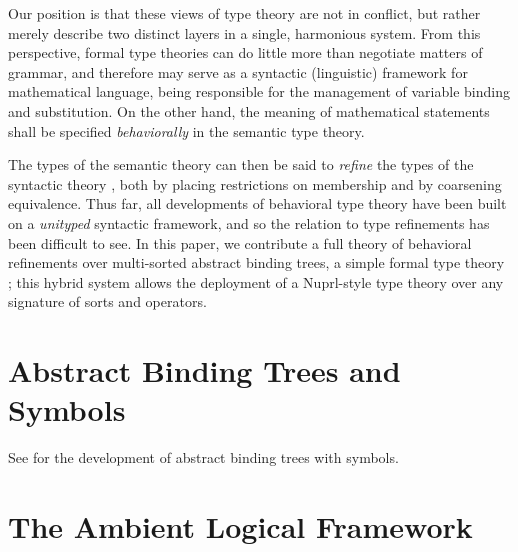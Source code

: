 \documentclass[11pt]{article}
\newif\ifcolored
\theoremstyle{definition}
\theoremstyle{remark}
\numberwithin{equation}{section}
\def\IModeColorName{MidnightBlue}
\def\OModeColorName{Maroon}
\def\IModeColorName{Black}
\def\OModeColorName{Black}
\newcommand\IMode[1]{{\color{\IModeColorName}{#1}}}
\newcommand\OMode[1]{{\color{\OModeColorName}{#1}}}
\begin{document}
Our position is that these views of type theory are not in conflict, but rather
merely describe two distinct layers in a single, harmonious system. From this
perspective, formal type theories can do little more than negotiate matters of
grammar, and therefore may serve as a syntactic (linguistic) framework
for mathematical language, being responsible for the management of variable
binding and substitution. On the other hand, the meaning of mathematical
statements shall be specified \emph{behaviorally} in the semantic type
theory.

The types of the semantic theory can then be said to \emph{refine} the types of
the syntactic theory \cite{harper-davies:2014, harper-duff:2015, harper:2016},
both by placing restrictions on membership and by coarsening equivalence. Thus
far, all developments of behavioral type theory have been built on a
\emph{unityped} syntactic framework, and so the relation to type refinements
has been difficult to see. In this paper, we contribute a full theory of
behavioral refinements over multi-sorted abstract binding trees, a simple
formal type theory \cite{harper:2016, sterling-morrison:2015}; this hybrid
system allows the deployment of a Nuprl-style type theory over any signature of
sorts and operators.

\section{Abstract Binding Trees and Symbols}

See \cite{sterling-morrison:2015} for the development of abstract binding trees
with symbols. 

\section{The Ambient Logical Framework}

\ifcolored
  In this paper, we hint at the \emph{modes} of judgments and assertions
  \cite{harper:2016} using colors, marking inputs with
  $\IMode{\texttt{blue}}$ and outputs with $\OMode{\texttt{red}}$. As a rule
  of thumb, inputs are things which are supplied when checking the
  correctness of a judgment, and outputs are things which are synthesized in
  the process.
\fi

\end{document}
